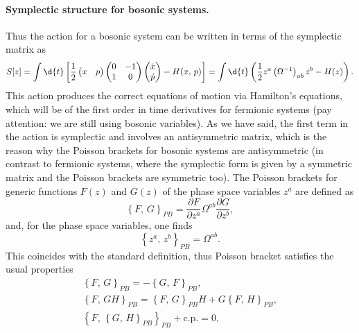 \paragraph{Symplectic structure for bosonic systems.}
Thus the action for a bosonic system can be written in terms of the symplectic matrix as
\begin{equation}
    S[z] = \int \d{t} \left[ \frac{1}{2} \begin{pmatrix}
            x & p
        \end{pmatrix} \begin{pmatrix}
            0 & -1 \\
            1 & 0
        \end{pmatrix} \begin{pmatrix}
            \dot{x} \\
            \dot{p}
        \end{pmatrix} - H(x,\,p)\right] = \int \d{t} \left( \frac{1}{2} z^a \left(\Omega^{-1}\right)_{ab} \dot{z}^b  - H(z) \right).
    \label{eq:symplectic_action_bosonic}
\end{equation}
This action produces the correct equations of motion via Hamilton’s equations, which will be of the first order in time derivatives for fermionic systems (pay attention: we are still using bosonic variables). As we have said, the first term in the action is symplectic and involves an antisymmetric matrix, which is the reason why the Poisson brackets for bosonic systems are antisymmetric (in contrast to fermionic systems, where the symplectic form is given by a symmetric matrix and the Poisson brackets are symmetric too). The Poisson brackets for generic functions \(F(z)\) and \(G(z)\) of the phase space variables \(z^a\) are defined as
\begin{equation}
    \left\{ F,\,G \right\}_{PB} = \frac{\partial F}{\partial z^a} \Omega^{ab} \frac{\partial G}{\partial z^b},
    \label{eq:poisson_brackets_bosonic}
\end{equation}
and, for the phase space variables, one finds
\[
    \left\{ z^a,\,z^b \right\}_{PB} = \Omega^{ab}.
\]
This coincides with the standard definition, thus Poisson bracket satisfies the usual properties
\begin{equation}
    \begin{aligned}
        \left\{ F,\, G \right\}_{PB}                            = - \left\{ G,\, F \right\}_{PB},                                  \\
        \left\{ F,\, GH \right\}_{PB}                           = \left\{ F,\, G \right\}_{PB} H + G \left\{ F,\, H \right\}_{PB}, \\
        \left\{ F,\, \left\{ G,\, H \right\}_{PB} \right\}_{PB} + \text{c.p.} = 0,
    \end{aligned}
    \label{eq:poisson_brackets_properties}
\end{equation}
